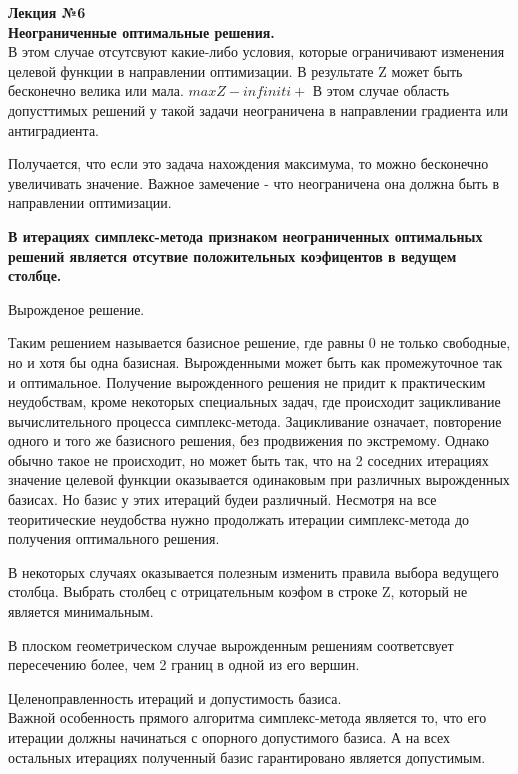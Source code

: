

\LARGE{ \textbf {Лекция №6}}\\
\Large{ \textbf {Неограниченные оптимальные решения.}}\\

В этом случае отсутсвуют какие-либо условия, которые ограничивают изменения целевой функции в направлении оптимизации.
В результате Z может быть бесконечно велика или мала.
$ max Z - infiniti + $
В этом случае область допусттимых решений у такой задачи неограничена в направлении градиента или антиградиента.

Получается, что если это задача нахождения максимума, то можно бесконечно увеличивать значение.
Важное замечение - что неограничена она должна быть в направлении оптимизации.

\textbf {В итерациях симплекс-метода признаком неограниченных оптимальных решений является отсутвие положительных коэфицентов в ведущем столбце.}

Вырожденое решение.

Таким решением называется базисное решение, где равны 0 не только свободные, но и хотя бы одна базисная.
Вырожденными может быть как промежуточное так и оптимальное.
Получение вырожденного решения не придит к практическим неудобствам, кроме некоторых специальных задач,
где происходит зацикливание вычислительного процесса симплекс-метода.
Зацикливание означает, повторение одного и того же базисного решения, без продвижения по экстремому.
Однако обычно такое не происходит, но может быть так,
что на 2 соседних итерациях значение целевой функции оказывается одинаковым при различных вырожденных базисах.
Но базис у этих итераций будеи различный.
Несмотря на все теоритические неудобства нужно продолжать итерации симплекс-метода до получения оптимального решения.

В некоторых случаях оказывается полезным изменить правила выбора ведущего столбца.
Выбрать столбец с отрицательным коэфом в строке Z, который не является минимальным.

В плоском геометрическом случае вырожденным решениям соответсвует пересечению более, чем 2 границ в одной из его вершин.

Целеноправленность итераций и допустимость базиса.\\
Важной особенность прямого алгоритма симплекс-метода является то, что его итерации должны начинаться с опорного допустимого базиса.
А на всех остальных итерациях полученный базис гарантировано является допустимым.

